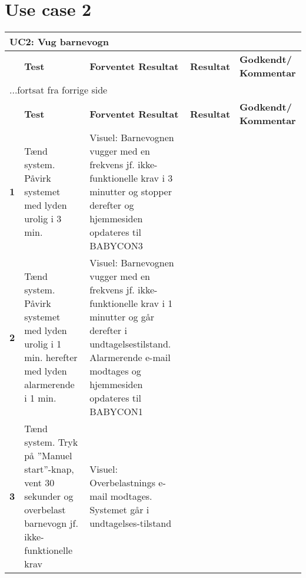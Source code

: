 \section*{Use case 2}
\begin{center}
	\label{accepttest:uc2} 
\begin{longtable}{|p{}|p{}|p{}|p{}|p{}|} %
\hline
\multicolumn{5}{|l|}{\textbf{UC2: Vug barnevogn}} \\ \hline
\multicolumn{1}{|c|}{} &
\textbf{Test} &
\textbf{Forventet \newline Resultat} &
\textbf{Resultat} &
\textbf{Godkendt/ \newline Kommentar} \\ \hline 
\endfirsthead

\multicolumn{5}{l}{...fortsat fra forrige side} \\ \hline 
\multicolumn{1}{|c|}{} &
\textbf{Test} &
\textbf{Forventet \newline Resultat} &
\textbf{Resultat} &
\textbf{Godkendt/ \newline Kommentar} \\ \hline 
\endhead



\textbf{1}	&Tænd system. Påvirk systemet med lyden 
			 urolig i 3 min.
			&Visuel: Barnevognen vugger med en frekvens 
			 jf. ikke-funktionelle krav i 3 minutter og 
			 stopper derefter og hjemmesiden opdateres 
			 til BABYCON3
			&
			& 
			\\\hline

\textbf{2}	&Tænd system. Påvirk systemet med lyden 
			 urolig i 1 min. herefter med lyden 
			 alarmerende i 1 min.
			&Visuel: Barnevognen vugger med en frekvens 
			 jf. ikke-funktionelle krav i 1 minutter og 
			 går derefter i undtagelsestilstand.
			 Alarmerende e-mail modtages 
			 og hjemmesiden opdateres til BABYCON1
			&
			& 
			\\\hline
			 
\textbf{3}	&Tænd system. Tryk på ''Manuel start''-knap, 
			 vent 30 sekunder og overbelast barnevogn jf. 
			 ikke-funktionelle krav
			&Visuel: Overbelastnings e-mail modtages. 
			 Systemet går i undtagelses-tilstand
			&
			&
			\\\hline

\end{longtable}
\end{center}